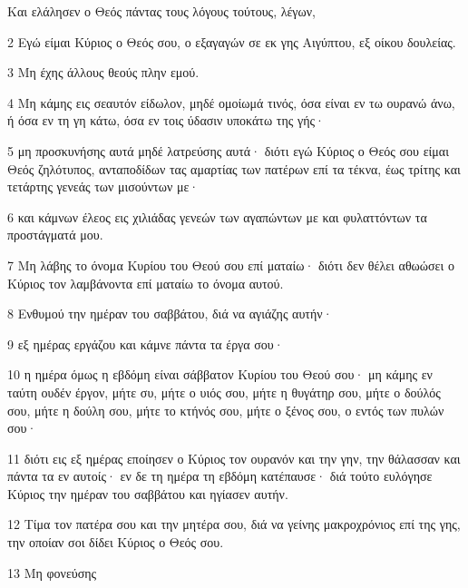 \par Και ελάλησεν ο Θεός πάντας τους λόγους τούτους, λέγων,
\par 2 Εγώ είμαι Κύριος ο Θεός σου, ο εξαγαγών σε εκ γης Αιγύπτου, εξ οίκου δουλείας.
\par 3 Μη έχης άλλους θεούς πλην εμού.
\par 4 Μη κάμης εις σεαυτόν είδωλον, μηδέ ομοίωμά τινός, όσα είναι εν τω ουρανώ άνω, ή όσα εν τη γη κάτω, όσα εν τοις ύδασιν υποκάτω της γής·
\par 5 μη προσκυνήσης αυτά μηδέ λατρεύσης αυτά· διότι εγώ Κύριος ο Θεός σου είμαι Θεός ζηλότυπος, ανταποδίδων τας αμαρτίας των πατέρων επί τα τέκνα, έως τρίτης και τετάρτης γενεάς των μισούντων με·
\par 6 και κάμνων έλεος εις χιλιάδας γενεών των αγαπώντων με και φυλαττόντων τα προστάγματά μου.
\par 7 Μη λάβης το όνομα Κυρίου του Θεού σου επί ματαίω· διότι δεν θέλει αθωώσει ο Κύριος τον λαμβάνοντα επί ματαίω το όνομα αυτού.
\par 8 Ενθυμού την ημέραν του σαββάτου, διά να αγιάζης αυτήν·
\par 9 εξ ημέρας εργάζου και κάμνε πάντα τα έργα σου·
\par 10 η ημέρα όμως η εβδόμη είναι σάββατον Κυρίου του Θεού σου· μη κάμης εν ταύτη ουδέν έργον, μήτε συ, μήτε ο υιός σου, μήτε η θυγάτηρ σου, μήτε ο δούλός σου, μήτε η δούλη σου, μήτε το κτήνός σου, μήτε ο ξένος σου, ο εντός των πυλών σου·
\par 11 διότι εις εξ ημέρας εποίησεν ο Κύριος τον ουρανόν και την γην, την θάλασσαν και πάντα τα εν αυτοίς· εν δε τη ημέρα τη εβδόμη κατέπαυσε· διά τούτο ευλόγησε Κύριος την ημέραν του σαββάτου και ηγίασεν αυτήν.
\par 12 Τίμα τον πατέρα σου και την μητέρα σου, διά να γείνης μακροχρόνιος επί της γης, την οποίαν σοι δίδει Κύριος ο Θεός σου.
\par 13 Μη φονεύσης

